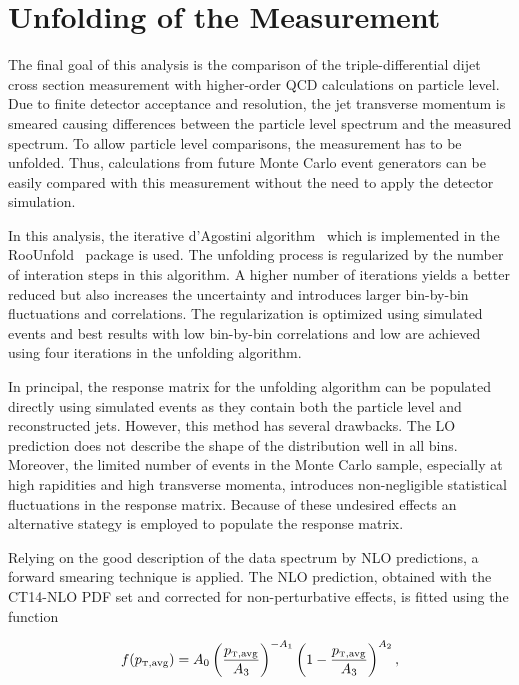 \section{Unfolding of the Measurement}
\label{sec:unfolding}

The final goal of this analysis is the comparison of the triple-differential
dijet cross section measurement with higher-order QCD calculations on
particle level. Due to finite detector acceptance and resolution, the jet
transverse momentum is smeared causing differences between the particle level
\ptavg spectrum and the measured spectrum. To allow particle level comparisons,
the measurement has to be unfolded. Thus, calculations from future Monte Carlo
event generators can be easily compared with this measurement without the need to
apply the detector simulation.

In this analysis, the iterative d'Agostini algorithm~\cite{DAgostini:1994zf}
which is implemented in the RooUnfold~\cite{Adye:2011gm} package is used. The
unfolding process is regularized by the number of interation steps in this
algorithm. A higher number of iterations yields a better reduced \chisq but also
increases the uncertainty and introduces larger bin-by-bin fluctuations and
correlations. The regularization is optimized using simulated events and best
results with low bin-by-bin correlations and low \chisq are achieved using
four iterations in the unfolding algorithm.

In principal, the response matrix for the unfolding algorithm can be populated
directly using simulated events as they contain both the particle level and
reconstructed jets. However, this method has several drawbacks. The LO
prediction does not describe the shape of the distribution well in all
bins. Moreover, the limited number of events in the Monte Carlo sample,
especially at high rapidities and high transverse momenta, introduces
non-negligible statistical fluctuations in the response matrix. Because of these
undesired effects an alternative stategy is employed to populate the response
matrix.

Relying on the good description of the data spectrum by NLO predictions, a forward
smearing technique is applied. The NLO prediction, obtained with the CT14-NLO PDF
set and corrected for non-perturbative effects, is fitted using the function

\begin{equation}
    f(\ptavg) = A_0 \left(
    \frac{\ptavg}{A_3}\right)^{-A_1}\left(1-\frac{\ptavg}{A_3}\right)^{A_2},
\end{equation}


